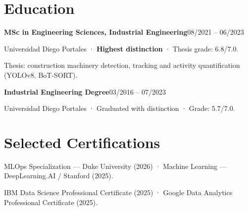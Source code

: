 \documentclass[10pt,a4paper]{article}
\newcommand{\entry}[2]{\par\addvspace{3pt}\textbf{#1}\hfill{\fontsize{9.5}{11}\selectfont\color{muted}#2}\par\nopagebreak}
\begin{document}
\section{Education}
\entry{MSc in Engineering Sciences, Industrial Engineering}{08/2021 -- 06/2023}
Universidad Diego Portales · \textbf{Highest distinction} · Thesis grade: 6.8/7.0.\par
Thesis: construction machinery detection, tracking and activity quantification (YOLOv8, BoT-SORT).\par
\entry{Industrial Engineering Degree}{03/2016 -- 07/2023}
Universidad Diego Portales · Graduated with distinction · Grade: 5.7/7.0.

\section{Selected Certifications}
MLOps Specialization — Duke University (2026) · Machine Learning — DeepLearning.AI / Stanford (2025).\par
IBM Data Science Professional Certificate (2025) · Google Data Analytics Professional Certificate (2025).
\end{document}
